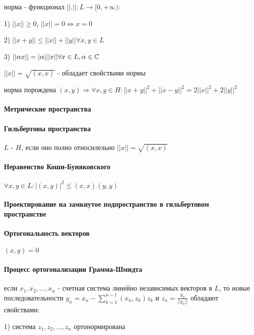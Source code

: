 \documentclass[russian,twocolumn]{article}
\begin{document}
норма - функционал $||.||:L \to [0, +\infty)$:

1) $||x|| \ge 0$, $||x|| = 0 \iff x = 0$

2) $||x + y|| \le ||x|| + ||y|| \forall x,y \in L$

3) $||\alpha x|| = |\alpha| ||x|| \forall x \in L, \alpha \in \Bbb C$

$||x||=\sqrt{(x,x)}$ - обладает свойствами нормы

норма порождена $(x,y)\Rightarrow\forall x,y \in H : ||x+y||^2 + ||x-y||^2 = 2||x||^2 + 2||y||^2$



\paragraph{Метрические пространства}

\paragraph{Гильбертовы пространства}

$L$ - $H$, если оно полно относилельно $||x||=\sqrt{(x,x)}$

\paragraph{Неравенство Коши-Буняковского}

$\forall x,y \in L : |(x,y)|^2 \le (x,x)(y,y)$

\paragraph{Проектирование на замкнутое подпространство в гильбертовом пространстве}

\paragraph{Ортогональность векторов} $(x,y)=0$

\paragraph{Процесс ортогонализации Грамма-Шмидта}

если $x_1,x_2,...,x_n$ - счетная система линейно независимых векторов в $L$, то новые последовательности $y_n=x_n-\sum_{k=1}^{n-1}(x_n,z_k)z_k$ и $z_n=\frac{y_{n}}{||y_{n}||}$ обладают свойствами:

1) система $z_{1},z_{2},...,z_{n}$ ортонормирована
\end{document}
